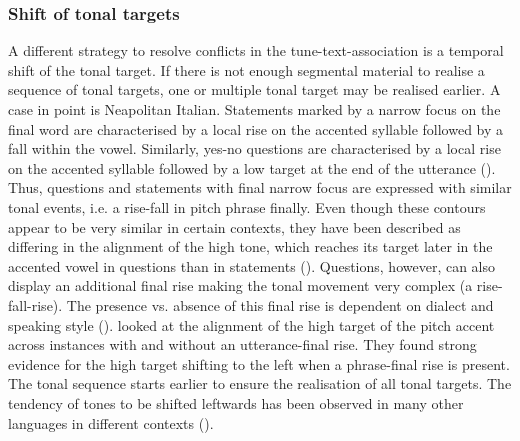 \subsubsection{Shift of tonal targets}
A different strategy to resolve conflicts in the tune-text-association is a temporal shift of the tonal target. If there is not enough segmental material to realise a sequence of tonal targets, one or multiple tonal target may be realised earlier. A case in point is Neapolitan Italian. Statements marked by a narrow focus on the final word are characterised by a local rise on the accented syllable followed by a fall within the vowel. Similarly, yes-no questions are characterised by a local rise on the accented syllable followed by a low target at the end of the utterance (\citealt{Dimperio2001}). Thus, questions and statements with final narrow focus are expressed with similar tonal events, i.e. a rise-fall in pitch phrase finally. Even though these contours appear to be very similar in certain contexts, they have been described as differing in the alignment of the high tone, which reaches its target later in the accented vowel in questions than in statements (\citealt{DimperioHouse1997}). Questions, however, can also display an additional final rise making the tonal movement very complex (a rise-fall-rise). The presence vs. absence of this final rise is dependent on dialect and speaking style (\citealt{Savino2012}). \citet{CangemiGrice2016} looked at the alignment of the high target of the pitch accent across instances with and without an utterance-final rise. They found strong evidence for the high target shifting to the left when a phrase-final rise is present. The tonal sequence starts earlier to ensure the realisation of all tonal targets. The tendency of tones to be shifted leftwards has been observed in many other languages in different contexts (\citealt{Steele1986,CaspersHeuven1993,Dimperio2001,Prieto.etal2005,Schepman.etal2006,Muecke.etal2009}).

